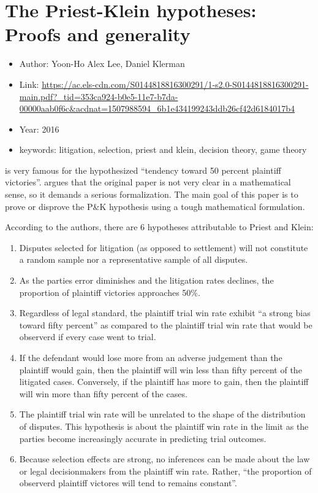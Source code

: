 \documentclass[]{report}
\providecommand{\tightlist}{%
  \setlength{\itemsep}{0pt}\setlength{\parskip}{0pt}}
\theoremstyle{definition}
\theoremstyle{definition}
\theoremstyle{definition}
\theoremstyle{remark}
\begin{document}
\section{The Priest-Klein hypotheses: Proofs and
generality}\label{the-priest-klein-hypotheses-proofs-and-generality}

\begin{itemize}
\tightlist
\item
  Author: Yoon-Ho Alex Lee, Daniel Klerman
\item
  Link:
  \url{https://ac.els-cdn.com/S0144818816300291/1-s2.0-S0144818816300291-main.pdf?_tid=353ca924-b0e5-11e7-b7da-00000aab0f6c\&acdnat=1507988594_6b1e434199243ddb26cf42d6184017b4}
\item
  Year: 2016
\item
  keywords: litigation, selection, priest and klein, decision theory,
  game theory
\end{itemize}

\citep{priest1984selection} is very famous for the hypothesized
``tendency toward 50 percent plaintiff victories''.
\citep{lee2016priest} argues that the original paper is not very clear
in a mathematical sense, so it demands a serious formalization. The main
goal of this paper is to prove or disprove the P\&K hypothesis using a
tough mathematical formulation.

According to the authors, there are 6 hypotheses attributable to Priest
and Klein:

\begin{enumerate}
\def\labelenumi{\arabic{enumi}.}
\item
  Disputes selected for litigation (as opposed to settlement) will not
  constitute a random sample nor a representative sample of all
  disputes.
\item
  As the parties error diminishes and the litigation rates declines, the
  proportion of plaintiff victories approaches 50\%.
\item
  Regardless of legal standard, the plaintiff trial win rate exhibit ``a
  strong bias toward fifty percent'' as compared to the plaintiff trial
  win rate that would be observerd if every case went to trial.
\item
  If the defendant would lose more from an adverse judgement than the
  plaintiff would gain, then the plaintiff will win less than fifty
  percent of the litigated cases. Conversely, if the plaintiff has more
  to gain, then the plaintiff will win more than fifty percent of the
  cases.
\item
  The plaintiff trial win rate will be unrelated to the shape of the
  distribution of disputes. This hypothesis is about the plaintiff win
  rate in the limit as the parties become increasingly accurate in
  predicting trial outcomes.
\item
  Because selection effects are strong, no inferences can be made about
  the law or legal decisionmakers from the plaintiff win rate. Rather,
  ``the proportion of observerd plaintiff victores will tend to remains
  constant''.
\end{enumerate}
\end{document}
